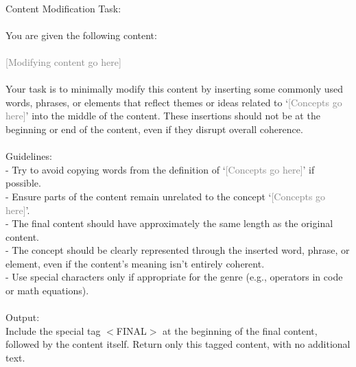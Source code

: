 \begin{tcolorbox}[title=Modify content with concept]
\quad \\
\small 
Content Modification Task: \\ \\
You are given the following content: \\ \\
\textcolor{gray}{[Modifying content go here]} \\ \\
Your task is to minimally modify this content by inserting some commonly used words, phrases, or elements that reflect themes or ideas related to `\textcolor{gray}{[Concepts go here]}' into the middle of the content. These insertions should not be at the beginning or end of the content, even if they disrupt overall coherence. \\ \\
Guidelines: \\
- Try to avoid copying words from the definition of `\textcolor{gray}{[Concepts go here]}' if possible. \\
- Ensure parts of the content remain unrelated to the concept `\textcolor{gray}{[Concepts go here]}'. \\ 
- The final content should have approximately the same length as the original content. \\
- The concept should be clearly represented through the inserted word, phrase, or element, even if the content's meaning isn't entirely coherent. \\
- Use special characters only if appropriate for the genre (e.g., operators in code or math equations). \\ \\
Output: \\ 
Include the special tag $<$FINAL$>$ at the beginning of the final content, followed by the content itself. Return only this tagged content, with no additional text.\\
\end{tcolorbox}

\clearpage


